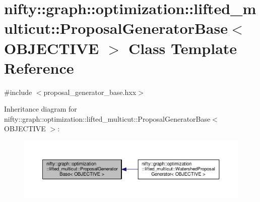 \hypertarget{classnifty_1_1graph_1_1optimization_1_1lifted__multicut_1_1ProposalGeneratorBase}{}\section{nifty\+:\+:graph\+:\+:optimization\+:\+:lifted\+\_\+multicut\+:\+:Proposal\+Generator\+Base$<$ O\+B\+J\+E\+C\+T\+I\+V\+E $>$ Class Template Reference}
\label{classnifty_1_1graph_1_1optimization_1_1lifted__multicut_1_1ProposalGeneratorBase}


{\ttfamily \#include $<$proposal\+\_\+generator\+\_\+base.\+hxx$>$}



Inheritance diagram for nifty\+:\+:graph\+:\+:optimization\+:\+:lifted\+\_\+multicut\+:\+:Proposal\+Generator\+Base$<$ O\+B\+J\+E\+C\+T\+I\+V\+E $>$\+:\nopagebreak
\begin{figure}[H]
\begin{center}
\leavevmode
\includegraphics[width=350pt]{classnifty_1_1graph_1_1optimization_1_1lifted__multicut_1_1ProposalGeneratorBase__inherit__graph}
\end{center}
\end{figure}
